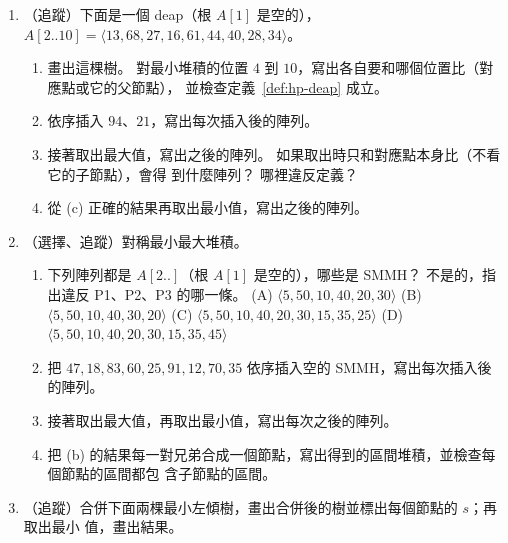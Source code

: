 \begin{enumerate}
\item\label{hp-q-deap} （追蹤）下面是一個 deap（根 $A[1]$ 是空的），
$A[2..10] = \langle 13, 68, 27, 16, 61, 44, 40, 28, 34 \rangle$。
\begin{enumerate}
\item 畫出這棵樹。 對最小堆積的位置 $4$ 到 $10$，寫出各自要和哪個位置比（對應點或它的父節點），
並檢查定義~\ref{def:hp-deap} 成立。
\item 依序插入 $94$、$21$，寫出每次插入後的陣列。
\item 接著取出最大值，寫出之後的陣列。 如果取出時只和對應點本身比（不看它的子節點），會得
到什麼陣列？ 哪裡違反定義？
\item 從 (c) 正確的結果再取出最小值，寫出之後的陣列。
\end{enumerate}

\item\label{hp-q-smmh} （選擇、追蹤）對稱最小最大堆積。
\begin{enumerate}
\item 下列陣列都是 $A[2..]$（根 $A[1]$ 是空的），哪些是 SMMH？ 不是的，指出違反 P1、P2、P3
的哪一條。 (A) $\langle 5, 50, 10, 40, 20, 30 \rangle$ \quad (B) $\langle 5, 50, 10, 40, 30, 20
\rangle$ \quad (C) $\langle 5, 50, 10, 40, 20, 30, 15, 35, 25 \rangle$ \quad (D) $\langle 5, 50,
10, 40, 20, 30, 15, 35, 45 \rangle$
\item 把 $47, 18, 83, 60, 25, 91, 12, 70, 35$ 依序插入空的 SMMH，寫出每次插入後的陣列。
\item 接著取出最大值，再取出最小值，寫出每次之後的陣列。
\item 把 (b) 的結果每一對兄弟合成一個節點，寫出得到的區間堆積，並檢查每個節點的區間都包
含子節點的區間。
\end{enumerate}

\item （追蹤）合併下面兩棵最小左傾樹，畫出合併後的樹並標出每個節點的 $s$；再取出最小
值，畫出結果。

\begin{center}
\hspace{1.5cm}%
\end{center}


\end{enumerate}
